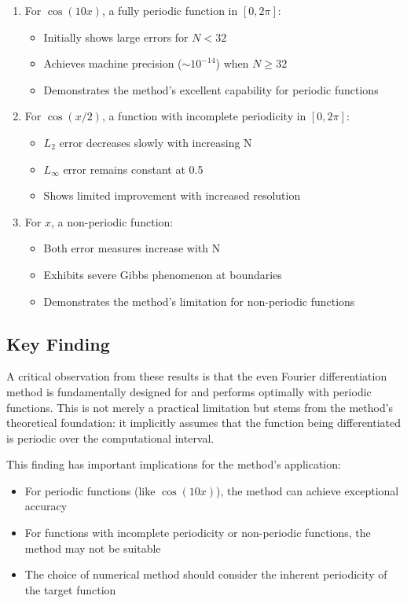 \documentclass{article}
\begin{document}
\begin{enumerate}
    \item For $\cos(10x)$, a fully periodic function in $[0,2\pi]$:
    \begin{itemize}
        \item Initially shows large errors for $N < 32$
        \item Achieves machine precision ($\sim 10^{-14}$) when $N \geq 32$
        \item Demonstrates the method's excellent capability for periodic functions
    \end{itemize}
    
    \item For $\cos(x/2)$, a function with incomplete periodicity in $[0,2\pi]$:
    \begin{itemize}
        \item $L_2$ error decreases slowly with increasing N
        \item $L_\infty$ error remains constant at 0.5
        \item Shows limited improvement with increased resolution
    \end{itemize}
    
    \item For $x$, a non-periodic function:
    \begin{itemize}
        \item Both error measures increase with N
        \item Exhibits severe Gibbs phenomenon at boundaries
        \item Demonstrates the method's limitation for non-periodic functions
    \end{itemize}
\end{enumerate}

\subsection{Key Finding}

A critical observation from these results is that the even Fourier differentiation method is fundamentally designed for and performs optimally with periodic functions. This is not merely a practical limitation but stems from the method's theoretical foundation: it implicitly assumes that the function being differentiated is periodic over the computational interval.

This finding has important implications for the method's application:
\begin{itemize}
    \item For periodic functions (like $\cos(10x)$), the method can achieve exceptional accuracy
    \item For functions with incomplete periodicity or non-periodic functions, the method may not be suitable
    \item The choice of numerical method should consider the inherent periodicity of the target function
\end{itemize}
\end{document}
